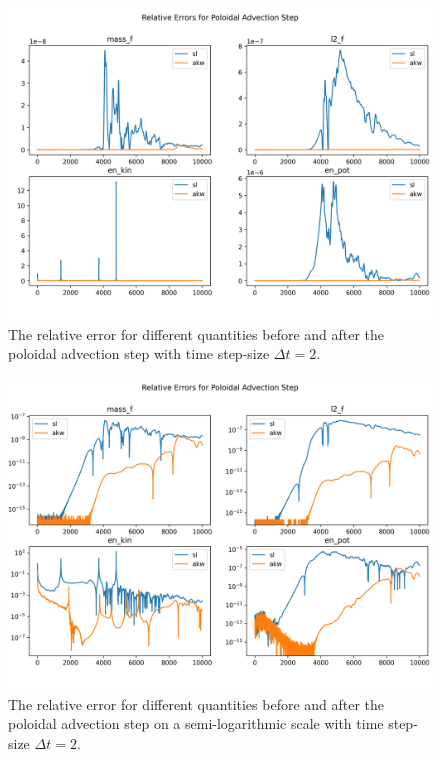 \begin{figure}
	\centering
	\includegraphics[width=0.9\linewidth]{rel_err dt2}
	\caption{The relative error for different quantities before and after the poloidal advection step with time step-size $\Delta t = 2$.}
	\label{fig:relerr_dt2}
\end{figure}


\begin{figure}
	\centering
	\includegraphics[width=0.9\linewidth]{rel_err_log dt2}
	\caption{The relative error for different quantities before and after the poloidal advection step on a semi-logarithmic scale with time step-size $\Delta t = 2$.}
	\label{fig:relerrlog_dt2}
\end{figure}


